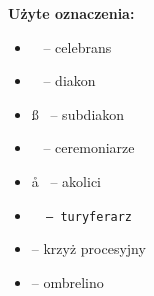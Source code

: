 \begin{center}
	\vspace*{2cm}


	\vspace{\fill}

	{\large \textbf{Użyte oznaczenia:}} \\

	\vspace{0.1\textwidth}

	{\large\centering
		\begin{itemize}[leftmargin=.43\linewidth,rightmargin=.35\linewidth,label=]
			\item \ii~ -- celebrans
			\item \dd~ -- diakon
			\item \ss~ -- subdiakon
			\item \cc~ -- ceremoniarze
			\item \aa~ -- akolici
			\item \tt~ -- turyferarz
			\item {} -- krzyż procesyjny
			\item \oo -- ombrelino
		\end{itemize}
	}

	\vspace{\fill}

\end{center}

